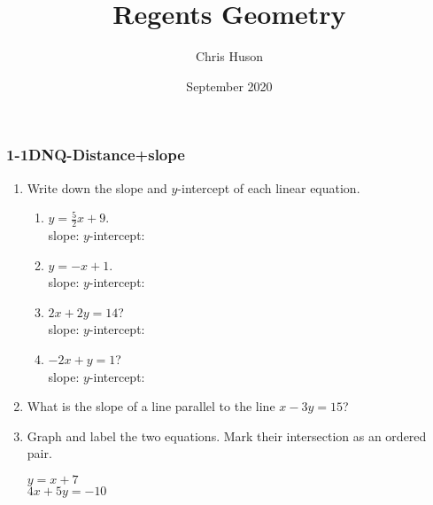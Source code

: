 \documentclass[12pt, twoside]{article}
\title{Regents Geometry}
\author{Chris Huson}
\date{September 2020}
\begin{document}
\subsubsection*{1-1DNQ-Distance+slope}
\begin{enumerate}
\item Write down the slope and $y$-intercept of each linear equation.
  \begin{enumerate}
    \item $y=\frac{5}{2} x+9$. \\[1cm]
      slope: \hspace{6cm} $y$-intercept: \\[0.5cm]
    \item $y=-x+1$. \\[1cm]
      slope: \hspace{6cm} $y$-intercept: \\[0.5cm]
    \item $2x+2y=14$? \\[4cm]
      slope: \hspace{6cm} $y$-intercept: \\[0.5cm]
    \item $-2x+y=1$? \\[4cm]
      slope: \hspace{6cm} $y$-intercept: \\[0.5cm]
  \end{enumerate}

\item What is the slope of a line parallel to the line $x-3y=15$?  
  \vspace{1.5cm}


\newpage
\item Graph and label the two equations. Mark their intersection as an ordered pair.
    \begin{multicols}{2}
      $y = x+7$ \\
      $4x+5y=-10$
    \end{multicols}     \vspace{4cm}


    \begin{center} %
    \end{center}

\end{enumerate}
\end{document}
